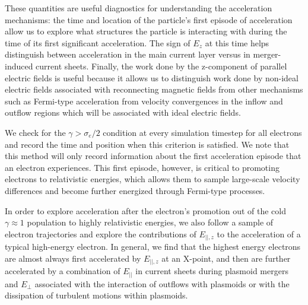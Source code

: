 These quantities are useful diagnostics for understanding the acceleration mechanisms: the time and location of the particle's first episode of acceleration allow us to explore what structures the particle is interacting with during the time of its first significant acceleration.  The sign of $E_{z}$ at this time helps distinguish between acceleration in the main current layer versus in merger-induced current sheets.  Finally, the work done by the z-component of parallel electric fields is useful because it allows us to distinguish work done by non-ideal electric fields associated with reconnecting magnetic fields from other mechanisms such as Fermi-type acceleration from velocity convergences in the inflow and outflow regions which will be associated with ideal electric fields.

We check for the $\gamma > \sigma_{e}/2$ condition at every simulation timestep for all electrons and record the time and position when this criterion is satisfied.  We note that this method will only record information about the first acceleration episode that an electron experiences.  This first episode, however, is critical to promoting electrons to relativistic energies, which allows them to sample large-scale velocity differences and become further energized through Fermi-type processes.

In order to explore acceleration after the electron's promotion out of the cold $\gamma\approx1$ population to highly relativistic energies, we also follow a sample of electron trajectories and explore the contributions of $E_{||,z}$ to the acceleration of a typical high-energy electron.  In general, we find that the highest energy electrons are almost always first accelerated by $E_{||,z}$ at an X-point, and then are further accelerated by a combination of $E_{||}$ in current sheets during plasmoid mergers and $E_{\bot}$ associated with the interaction of outflows with plasmoids or with the dissipation of turbulent motions within plasmoids.

